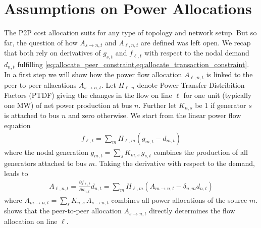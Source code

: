 \documentclass[11pt,twocolumn]{article}
\newcommand{\pdv}[2]{\frac{\partial #1}{\partial #2}}
\newcommand{\generation}{g_{s,t}}
\newcommand{\nodalgeneration}[1][n]{g_{#1,t}}
\newcommand{\demand}[1][n]{d_{#1,t}}
\newcommand{\incidenceGenerators}[1][n]{K_{#1,s}}
\newcommand{\ptdf}[1][n]{H_{\ell,#1}}
\newcommand{\slackk}[1][n]{k^*_{#1}}
\newcommand{\flow}{f_{\ell,t}}
\newcommand{\allocatePeer}[1][s \rightarrow n]{A_{#1,t}}
\newcommand{\allocateFlow}[1][n]{A_{\ell,#1,t}}
\begin{document}
\section{Assumptions on Power Allocations}
\label{sec:localizing_allocations}

The P2P cost allocation suits for any type of topology and network setup. But so far, the question of how $\allocatePeer$ and $\allocateFlow$ are defined was left open. We recap that both rely on derivatives of $\generation$ and $\flow$  with respect to the nodal demand $\demand$ fulfilling \cref{eq:allocate_peer_constraint,eq:allocate_transaction_constraint}. \\
% 
In a first step we will show how the power flow allocation $\allocateFlow$ is linked to the peer-to-peer allacations $\allocatePeer$. Let $\ptdf$ denote Power Transfer Distribition Factors (PTDF) giving the changes in the flow on line $\ell$ for one unit (typically one MW) of net power production at bus $n$.  Further let $\incidenceGenerators$ be 1 if generator $s$ is attached to bus $n$ and zero otherwise. We start from the linear power flow equation
\begin{align}
 \flow  = \sum_m \ptdf[m] \left( \nodalgeneration[m] - \demand[m] \right)  
\end{align}
where the nodal generation $\nodalgeneration[m] = \sum_s \incidenceGenerators[m] \, \generation $ combines the production of all generators attached to bus $m$. Taking the derivative with respect to the demand, leads to 
\begin{align}
 \allocateFlow = \pdv{\flow}{\demand} \demand = \sum_m \ptdf[m] \left( \allocatePeer[m \rightarrow n]  - \delta_{n,m} \demand \right) 
 \label{eq:allocate_peer_to_allocate_flow}
\end{align}
where $\allocatePeer[m \rightarrow n] = \sum_s \incidenceGenerators \, \allocatePeer$ combines all power allocations of the source $m$.  shows that the peer-to-peer allocation $\allocatePeer$ directly determines the flow allocation on line $\ell$.
\end{document}
